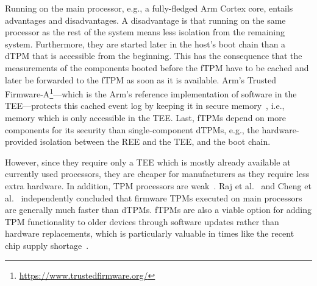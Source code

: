 Running on the main processor, e.g., a fully-fledged Arm Cortex core, entails advantages and disadvantages.
A disadvantage is that running on the same processor as the rest of the system means less isolation from the remaining system.
Furthermore, they are started later in the host's boot chain than a \ac{dTPM} that is accessible from the beginning.
This has the consequence that the measurements of the components booted before the fTPM have to be cached and later be forwarded to the \ac{fTPM} as soon as it is available.
Arm's Trusted Firmware-A\footnote{\url{https://www.trustedfirmware.org/}}---which is the Arm's reference implementation of software in the \ac{TEE}---protects this cached event log by keeping it in secure memory~\cite{tf-a-measured-boot}, i.e., memory which is only accessible in the \ac{TEE}. 
Last, fTPMs depend on more components for its security than single-component \acp{dTPM}, e.g., the hardware-provided isolation between the \ac{REE} and the \ac{TEE}, and the boot chain.


However, since they require only a TEE which is mostly already available at currently used processors, they are cheaper for manufacturers as they require less extra hardware.
In addition, TPM processors are weak~\cite{Goh2013, Raj2015}.
Raj et al.~\cite{Raj2015} and Cheng et al.~\cite{Cheng2020} independently concluded that firmware TPMs executed on main processors are generally much faster than \acp{dTPM}.
\acp{fTPM} are also a viable option for adding \ac{TPM} functionality to older devices through software updates rather than hardware replacements, which is particularly valuable in times like the recent chip supply shortage~\cite{Voas2021, casper2021}.




